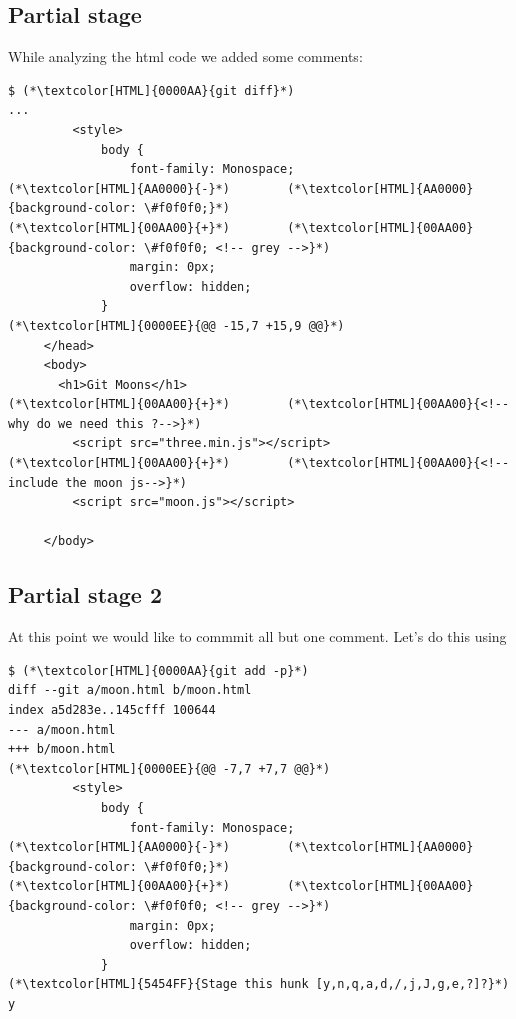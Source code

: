 \subsection{Partial stage}
\begin{frame}[fragile]
  \subslidetitle
  While analyzing the html code we added some comments:

 \begin{lstlisting}
$ (*\textcolor[HTML]{0000AA}{git diff}*)
...
         <style>
             body {
                 font-family: Monospace;
(*\textcolor[HTML]{AA0000}{-}*)        (*\textcolor[HTML]{AA0000}{background-color: \#f0f0f0;}*)
(*\textcolor[HTML]{00AA00}{+}*)        (*\textcolor[HTML]{00AA00}{background-color: \#f0f0f0; <!-- grey -->}*)
                 margin: 0px;
                 overflow: hidden;
             }
(*\textcolor[HTML]{0000EE}{@@ -15,7 +15,9 @@}*)
     </head>
     <body>
       <h1>Git Moons</h1>
(*\textcolor[HTML]{00AA00}{+}*)        (*\textcolor[HTML]{00AA00}{<!--why do we need this ?-->}*)
         <script src="three.min.js"></script>
(*\textcolor[HTML]{00AA00}{+}*)        (*\textcolor[HTML]{00AA00}{<!--include the moon js-->}*)
         <script src="moon.js"></script>

     </body>
 \end{lstlisting}
\end{frame}

\subsection{Partial stage 2}
\begin{frame}[fragile]
  \subslidetitle
  At this point we would like to commmit all but one comment. Let's do this using 
 \begin{lstlisting}
$ (*\textcolor[HTML]{0000AA}{git add -p}*)
diff --git a/moon.html b/moon.html
index a5d283e..145cfff 100644
--- a/moon.html
+++ b/moon.html
(*\textcolor[HTML]{0000EE}{@@ -7,7 +7,7 @@}*)
         <style>
             body {
                 font-family: Monospace;
(*\textcolor[HTML]{AA0000}{-}*)        (*\textcolor[HTML]{AA0000}{background-color: \#f0f0f0;}*)
(*\textcolor[HTML]{00AA00}{+}*)        (*\textcolor[HTML]{00AA00}{background-color: \#f0f0f0; <!-- grey -->}*)
                 margin: 0px;
                 overflow: hidden;
             }
(*\textcolor[HTML]{5454FF}{Stage this hunk [y,n,q,a,d,/,j,J,g,e,?]?}*) y
 \end{lstlisting}
\end{frame}

